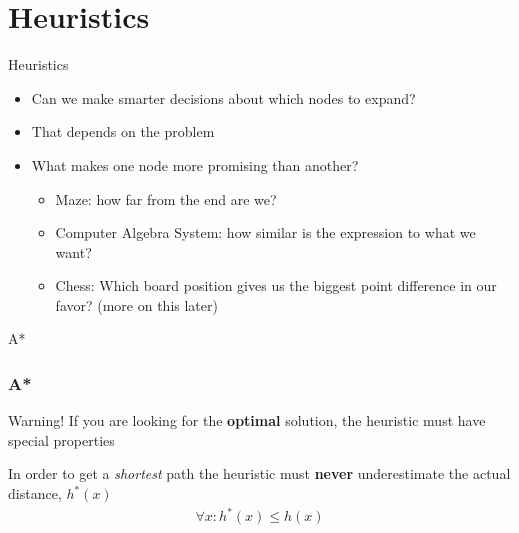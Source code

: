\documentclass[presentation]{beamer}
\begin{document}
\section{Heuristics}
\begin{frame}{Heuristics}
  \begin{itemize}
  \item Can we make smarter 
    decisions about which nodes to
    expand?
  \item That depends on the problem
  \item What makes one node more promising than another?
   \begin{itemize}
   \item<2-> Maze: how far from the end are we?
   \item<3-> Computer Algebra System: how similar is the expression to
     what we want?
   \item<4-> Chess: Which board position gives us the biggest point
     difference in our favor?  (more on this later)
   \end{itemize}
  \end{itemize}
\end{frame}
\begin{frame}{A*}
  \normalsize
\end{frame}
\begin{frame}
  \frametitle{A*}
  \begin{alertblock} {Warning!}
    If you are looking for the \textbf{optimal} solution, the heuristic must
    have special properties
  \end{alertblock}
    In order to get a \emph{shortest} path the heuristic must \textbf{never}
  underestimate the actual distance, $h^*(x)$
  \begin{align*}
    \forall x :h^*(x) \le  h(x)
  \end{align*}
\end{frame}
\end{document}
